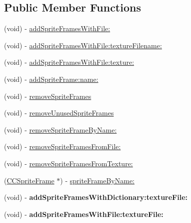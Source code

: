 \subsection*{Public Member Functions}
\begin{DoxyCompactItemize}
\item 
(void) -\/ \hyperlink{class_c_c_sprite_frame_cache_a98ba94307a913f9eafad3ba44b0cb751}{add\-Sprite\-Frames\-With\-File\-:}
\item 
(void) -\/ \hyperlink{class_c_c_sprite_frame_cache_af99ecfe844cf9bb42ab498a5b3894ad3}{add\-Sprite\-Frames\-With\-File\-:texture\-Filename\-:}
\item 
(void) -\/ \hyperlink{class_c_c_sprite_frame_cache_ac628abacc843faa02d8ea6e03f5c365a}{add\-Sprite\-Frames\-With\-File\-:texture\-:}
\item 
(void) -\/ \hyperlink{class_c_c_sprite_frame_cache_a9badf2589956d9659c640946b3cdd547}{add\-Sprite\-Frame\-:name\-:}
\item 
(void) -\/ \hyperlink{class_c_c_sprite_frame_cache_a9b9719273023e0d73078d7ed779ea35a}{remove\-Sprite\-Frames}
\item 
(void) -\/ \hyperlink{class_c_c_sprite_frame_cache_a849066146f123d21dce0ce5378d03516}{remove\-Unused\-Sprite\-Frames}
\item 
(void) -\/ \hyperlink{class_c_c_sprite_frame_cache_a0d38ec48a0084cc32ca90edd5475ae15}{remove\-Sprite\-Frame\-By\-Name\-:}
\item 
(void) -\/ \hyperlink{class_c_c_sprite_frame_cache_aa3a61d8b6e9936f9e5a3bf8f4d264e10}{remove\-Sprite\-Frames\-From\-File\-:}
\item 
(void) -\/ \hyperlink{class_c_c_sprite_frame_cache_ad2bb95d9e83bbf732c9eba2514bc24cd}{remove\-Sprite\-Frames\-From\-Texture\-:}
\item 
(\hyperlink{interface_c_c_sprite_frame}{C\-C\-Sprite\-Frame} $\ast$) -\/ \hyperlink{class_c_c_sprite_frame_cache_af9d4b9ed99c9193a9a7e3a3516ffc796}{sprite\-Frame\-By\-Name\-:}
\item 
\hypertarget{class_c_c_sprite_frame_cache_a8b131a12f1f05ae62d24a7cad0d35e4f}{(void) -\/ {\bfseries add\-Sprite\-Frames\-With\-Dictionary\-:texture\-File\-:}}\label{class_c_c_sprite_frame_cache_a8b131a12f1f05ae62d24a7cad0d35e4f}

\item 
\hypertarget{class_c_c_sprite_frame_cache_a6ab886afb1dc60e6aaf483bc258c9ae6}{(void) -\/ {\bfseries add\-Sprite\-Frames\-With\-File\-:texture\-File\-:}}\label{class_c_c_sprite_frame_cache_a6ab886afb1dc60e6aaf483bc258c9ae6}

\end{DoxyCompactItemize}
